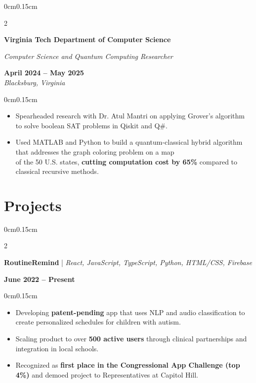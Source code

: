 \documentclass[10pt, letterpaper]{article}
\newenvironment{highlights}{
    \begin{itemize}[topsep=0pt, parsep=0pt, partopsep=0pt, itemsep=0pt, leftmargin=0.6cm]
}{
    \end{itemize}
}
\newenvironment{onecolentry}{
    \begin{adjustwidth}{0cm}{0.15cm}
}{
    \end{adjustwidth}
}
\newenvironment{twocolentry}[2][]{
    \onecolentry
    \def\secondColumn{#2}
    \setcolumnwidth{\fill, 4cm}
    \begin{paracol}{2}
}{
    \switchcolumn \raggedleft \secondColumn
    \end{paracol}
    \endonecolentry
}
\begin{document}
    \vspace{0.05cm}

    \begin{twocolentry}{\textbf{April 2024 -- May 2025} \\ \textit{Blacksburg, Virginia}}
        \textbf{Virginia Tech Department of Computer Science}
        
        \textit{Computer Science and Quantum Computing Researcher}
    \end{twocolentry}
    \vspace{-0.1cm}
    \begin{onecolentry}
        \begin{highlights}
            \item Spearheaded research with Dr. Atul Mantri on applying Grover's algorithm to solve boolean SAT problems in Qiskit and Q\#.
            \item Used MATLAB and Python to build a quantum-classical hybrid algorithm that addresses the graph coloring problem on a map \\ of the 50 U.S. states, \textbf{cutting computation cost by 65\%} compared to classical recursive methods.
        \end{highlights}
    \end{onecolentry}

    \vspace{0.05cm}

    \section{Projects}
    \vspace{0.1cm}

    \begin{twocolentry}{\textbf{June 2022 -- Present}}
        \textbf{RoutineRemind} | \textit{React, JavaScript, TypeScript, Python, HTML/CSS, Firebase}
    \end{twocolentry}
    \vspace{-0.1cm}
    \begin{onecolentry}
        \begin{highlights}
            \item Developing \textbf{patent-pending} app that uses NLP and audio classification to create personalized schedules for children with autism.
            \item Scaling product to over \textbf{500 active users} through clinical partnerships and integration in local schools.
            \item Recognized as \textbf{first place in the Congressional App Challenge (top 4\%)} and demoed project to Representatives at Capitol Hill.
        \end{highlights}
    \end{onecolentry}
\end{document}
